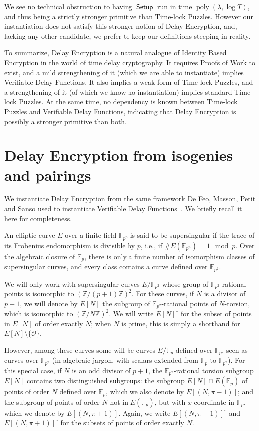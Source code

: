 \documentclass{llncs}
\newcommand{\Z}{\mathbb{Z}}
\newcommand{\F}{\mathbb{F}}
\renewcommand{\O}{\mathcal{O}}
\DeclareMathOperator{\poly}{poly}
\DeclareMathOperator{\Setup}{\mathsf{Setup}}
\begin{document}
We see no technical obstruction to having $\Setup$ run in time
$\poly(\lambda,\log T)$, and thus being a strictly stronger primitive
than Time-lock Puzzles. %
However our instantiation does not satisfy this stronger notion of
Delay Encryption, and, lacking any other candidate, we prefer to keep
our definitions steeping in reality.

\medskip

To summarize, Delay Encryption is a natural analogue of Identity Based
Encryption in the world of time delay cryptography. %
It requires Proofs of Work to exist, and a mild strengthening of it
(which we are able to instantiate) implies Verifiable Delay
Functions. %
It also implies a weak form of Time-lock Puzzles, and a strengthening
of it (of which we know no instantiation) implies standard Time-lock
Puzzles. %
At the same time, no dependency is known between Time-lock Puzzles and
Verifiable Delay Functions, indicating that Delay Encryption is
possibly a stronger primitive than both.


\section{Delay Encryption from isogenies and pairings}
\label{sec:delay-encrypt-from}

We instantiate Delay Encryption from the same framework De Feo,
Masson, Petit and Sanso used to instantiate Verifiable Delay
Functions~\cite{10.1007/978-3-030-34578-5_10}. %
We briefly recall it here for completeness.

An elliptic curve $E$ over a finite field $\F_{p^n}$ is said to be
supersingular if the trace of its Frobenius endomorphism is divisible
by $p$, i.e., if $\#E(\F_{p^n})=1\mod p$. %
Over the algebraic closure of $\F_p$, there is only a finite number of
isomorphism classes of supersingular curves, and every class contains
a curve defined over $\F_{p^2}$. %

We will only work with supersingular curves $E/\F_{p^2}$ whose group
of $\F_{p^2}$-rational points is isomorphic to ${(\Z/(p+1)\Z)}^2$. %
For these curves, if $N$ is a divisor of $p+1$, we will denote by
$E[N]$ the subgroup of $\F_{p^2}$-rational points of $N$-torsion,
which is isomorphic to ${(\Z/N\Z)}^2$. %
We will write $E[N]^\circ$ for the subset of points in $E[N]$ of order
exactly $N$; when $N$ is prime, this is simply a shorthand for
$E[N] \setminus \{\O\}$.

However, among these curves some will be curves $E/\F_p$ defined over
$\F_p$, seen as curves over $\F_{p^2}$ (in algebraic jargon, with
scalars extended from $\F_p$ to $\F_{p^2}$). %
For this special case, if $N$ is an odd divisor of $p+1$, the
$\F_{p^2}$-rational torsion subgroup $E[N]$ contains two distinguished
subgroups: the subgroup $E[N]\cap E(\F_p)$ of points of order $N$
defined over $\F_p$, which we also denote by $E[(N,\pi-1)]$; and the
subgroup of points of order $N$ not in $E(\F_p)$, but with
$x$-coordinate in $\F_p$, which we denote by $E[(N,\pi+1)]$. %
Again, we write $E[(N,\pi-1)]^\circ$ and $E[(N,\pi+1)]^\circ$ for the
subsets of points of order exactly $N$.
\end{document}
